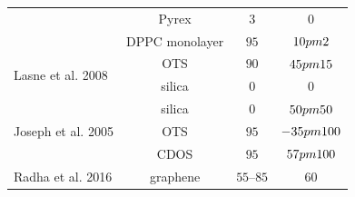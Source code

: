 \begin{table}
\begin{tabular}{lccc}
     & Pyrex & $3$ & $0$ \\
     & DPPC monolayer & $95$ & $10 \\pm 2$ \\
    \multirow{2}{*}{Lasne et al. 2008} & OTS & $90$ & $45 \\pm 15$ \\
     & silica & $0$ & $0$ \\
    \multirow{3}{*}{Joseph et al. 2005} & silica & $0$ & $50 \\pm 50$ \\
     & OTS & $95$ & $-35 \\pm 100$ \\
     & CDOS & $95$ & $57 \\pm 100$ \\
    \multirow{1}{*}{Radha et al. 2016} & graphene & $55$--$85$ & $60$ \\
        \hline
    \end{tabular}
\end{table}
